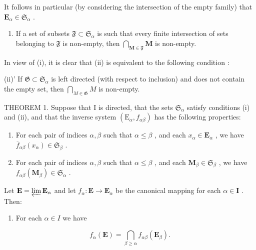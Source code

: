It follows in particular (by considering the intersection of the empty family) that \(\mathbf{E}_{\alpha} \in \mathfrak{S}_{\alpha}\) .

\begin{enumerate}
\def\labelenumi{(\roman{enumi})}
\setcounter{enumi}{1}
\tightlist
\item
  If a set of subsets \(\mathfrak{F} \subset \mathfrak{S}_{\alpha}\) is such that every finite intersection of sets belonging to \(\mathfrak{F}\) is non-empty, then \(\bigcap_{\mathbf{M} \in \mathfrak{F}} \mathbf{M}\) is non-empty.
\end{enumerate}

In view of (i), it is clear that (ii) is equivalent to the following condition :

(ii)' If \(\mathfrak{G} \subset \mathfrak{S}_{\alpha}\) is left directed (with respect to inclusion) and does not contain the empty set, then \(\bigcap_{M \in \mathfrak{G}} M\) is non-empty.

THEOREM 1. Suppose that I is directed, that the sets \(\mathfrak{S}_{\alpha}\) satisfy conditions (i) and (ii), and that the inverse system \((\mathrm{E}_{\alpha}, f_{\alpha\beta})\) has the following properties:

\begin{enumerate}
\def\labelenumi{(\roman{enumi})}
\setcounter{enumi}{2}
\item
  For each pair of indices \(\alpha, \beta\) such that \(\alpha \leqslant \beta\) , and each \(x_{\alpha} \in \mathbf{E}_{\alpha}\) , we have \(\overline{f}_{\alpha\beta}(x_{\alpha}) \in \mathfrak{S}_{\beta}\) .
\item
  For each pair of indices \(\alpha, \beta\) such that \(\alpha \leqslant \beta\) , and each \(\mathbf{M}_{\beta} \in \mathfrak{S}_{\beta}\) , we have \(f_{\alpha \beta}(\mathbf{M}_{\beta}) \in \mathfrak{S}_{\alpha}\) .
\end{enumerate}

Let \(\mathbf{E} = \varprojlim \mathbf{E}_{\alpha}\) and let \(f_{\alpha}: \mathbf{E} \to \mathbf{E}_{\alpha}\) be the canonical mapping for each \(\alpha \in \mathbf{I}\) . Then:

\begin{enumerate}
\def\labelenumi{(\alph{enumi})}
\tightlist
\item
  For each \(\alpha \in I\) we have
\end{enumerate}

\[
f _ {\alpha} (\mathbf {E}) = \bigcap_ {\beta \geqslant \alpha} f _ {\alpha \beta} (\mathbf {E} _ {\beta}).\tag{19}
\]

